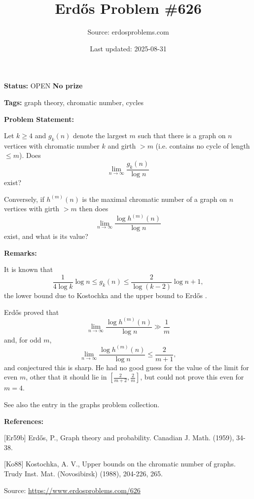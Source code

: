 \documentclass{article}
\title{Erd\H{o}s Problem \#626}
\date{Last updated: 2025-08-31}
\author{Source: erdosproblems.com}
\begin{document}
\maketitle

\noindent\textbf{Status:} OPEN \quad \textbf{No prize}

\noindent\textbf{Tags:} graph theory, chromatic number, cycles

\medskip
\noindent\textbf{Problem Statement:}

Let $k\geq 4$ and $g_k(n)$ denote the largest $m$ such that there is a graph on $n$ vertices with chromatic number $k$ and girth $>m$ (i.e. contains no cycle of length $\leq m$). Does\[\lim_{n\to \infty}\frac{g_k(n)}{\log n}\]exist?

Conversely, if $h^{(m)}(n)$ is the maximal chromatic number of a graph on $n$ vertices with girth $>m$ then does\[\lim_{n\to \infty}\frac{\log h^{(m)}(n)}{\log n}\]exist, and what is its value?

\bigskip
\noindent\textbf{Remarks:}

It is known that\[\frac{1}{4\log k}\log n\leq g_k(n) \leq \frac{2}{\log(k-2)}\log n+1,\]the lower bound due to Kostochka \cite{Ko88} and the upper bound to Erd\H{o}s \cite{Er59b}. 

Erd\H{o}s \cite{Er59b} proved that\[\lim_{n\to \infty}\frac{\log h^{(m)}(n)}{\log n}\gg \frac{1}{m}\]and, for odd $m$,\[\lim_{n\to \infty}\frac{\log h^{(m)}(n)}{\log n}\leq \frac{2}{m+1},\]and conjectured this is sharp. He had no good guess for the value of the limit for even $m$, other that it should lie in $[\frac{2}{m+2},\frac{2}{m}]$, but could not prove this even for $m=4$.

See also the entry in the graphs problem collection.

\bigskip
\noindent\textbf{References:}

[Er59b] Erd\H{o}s, P., Graph theory and probability. Canadian J. Math. (1959), 34-38.
 
 [Ko88] Kostochka, A. V., Upper bounds on the chromatic number of graphs. Trudy Inst. Mat. (Novosibirsk) (1988), 204-226, 265.

\bigskip
\noindent\small{Source: \url{https://www.erdosproblems.com/626}}
\end{document}
